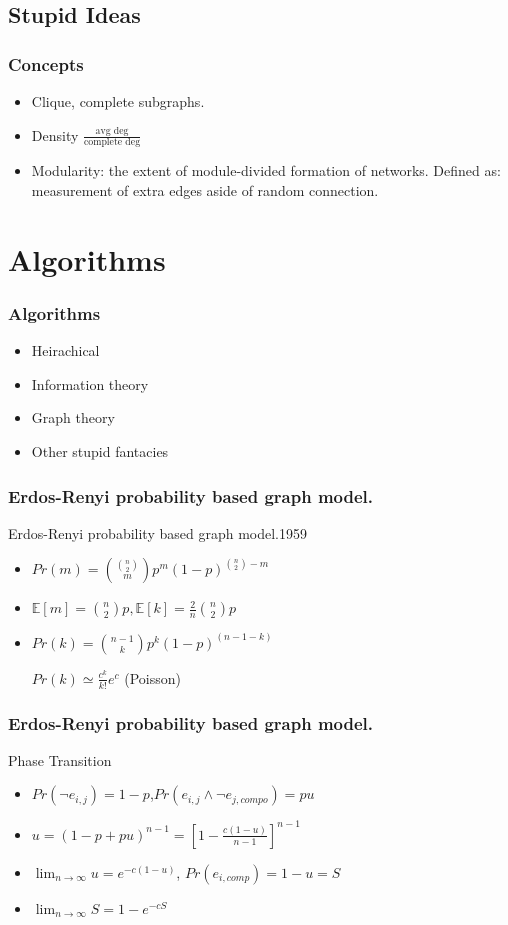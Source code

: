 \documentclass[professionalfonts]{beamer}
\begin{document}
\subsection{Stupid Ideas}
\begin{frame}
\frametitle{Concepts}
\begin{itemize}
\item Clique, complete subgraphs.
\item Density $\frac{\text{avg deg}}{\text{complete deg}}$
\item Modularity: the extent of module-divided formation of networks.
Defined as: measurement of extra edges aside of random connection.
\end{itemize}
\end{frame}



\section{Algorithms}
\begin{frame}
\frametitle{Algorithms}
\begin{itemize}
\item Heirachical
\item Information theory
\item Graph theory
\item Other stupid fantacies
\end{itemize}
\end{frame}

\begin{frame}
\frametitle{Erdos-Renyi probability based graph model.}
Erdos-Renyi probability based graph model.1959

\begin{itemize}
\item $Pr(m)=\binom{\binom{n}{2}}{m} p^m (1-p)^{\binom{n}{2}-m}$
\item $\mathbb{E}[m]=\binom{n}{2}p,\mathbb{E}[k]=\frac{2}{n}\binom{n}{2}p$
\item $Pr(k)=\binom{n-1}{k}p^k(1-p)^{(n-1-k)}$

$Pr(k)\simeq \frac{c^k}{k!}e^c$ (Poisson)
\end{itemize}
\end{frame}


\begin{frame}
\frametitle{Erdos-Renyi probability based graph model.}
Phase Transition
\begin{itemize}
\item $Pr(\neg e_{i,j})=1-p$,$Pr(e_{i,j} \land \neg e_{j,compo})=pu$
\item $u=(1-p+pu)^{n-1}=[1-\frac{c(1-u)}{n-1}]^{n-1}$
\item $\lim_{n \rightarrow \infty} u = e^{-c(1-u)}$, $Pr(e_{i,comp})=1-u=S$
\item $\lim_{n \rightarrow \infty} S = 1-e^{-cS}$
\end{itemize}
\end{frame}
\end{document}
